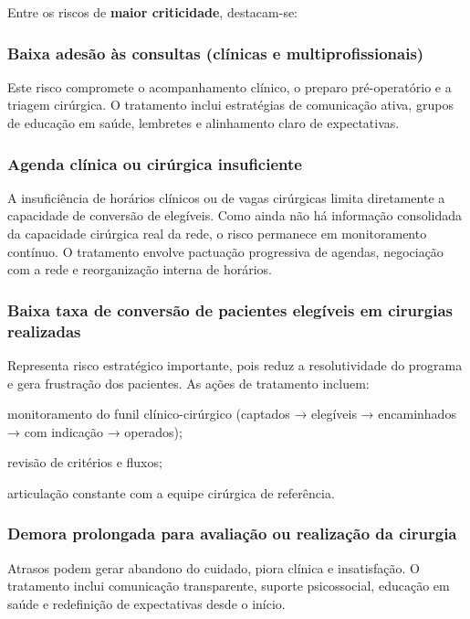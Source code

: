 \documentclass[12pt]{article}
\begin{document}
Entre os riscos de \textbf{maior criticidade}, destacam-se:

\subsubsection{\textbf{Baixa adesão às consultas (clínicas e multiprofissionais)}}
\label{sec:org754f6fe}
Este risco compromete o acompanhamento clínico, o preparo pré-operatório e a triagem cirúrgica. O tratamento inclui estratégias de comunicação ativa, grupos de educação em saúde, lembretes e alinhamento claro de expectativas.

\subsubsection{\textbf{Agenda clínica ou cirúrgica insuficiente}}
\label{sec:org42387d9}
A insuficiência de horários clínicos ou de vagas cirúrgicas limita diretamente a capacidade de conversão de elegíveis. Como ainda não há informação consolidada da capacidade cirúrgica real da rede, o risco permanece em monitoramento contínuo. O tratamento envolve pactuação progressiva de agendas, negociação com a rede e reorganização interna de horários.

\subsubsection{\textbf{Baixa taxa de conversão de pacientes elegíveis em cirurgias realizadas}}
\label{sec:orgaca91d3}
Representa risco estratégico importante, pois reduz a resolutividade do programa e gera frustração dos pacientes. As ações de tratamento incluem:

\begin{hlevelthree}
\item monitoramento do funil clínico-cirúrgico (captados → elegíveis → encaminhados → com indicação → operados);
\item revisão de critérios e fluxos;
\item articulação constante com a equipe cirúrgica de referência.
\end{hlevelthree}

\subsubsection{\textbf{Demora prolongada para avaliação ou realização da cirurgia}}
\label{sec:org1ffbb72}
Atrasos podem gerar abandono do cuidado, piora clínica e insatisfação. O tratamento inclui comunicação transparente, suporte psicossocial, educação em saúde e redefinição de expectativas desde o início.
\end{document}
